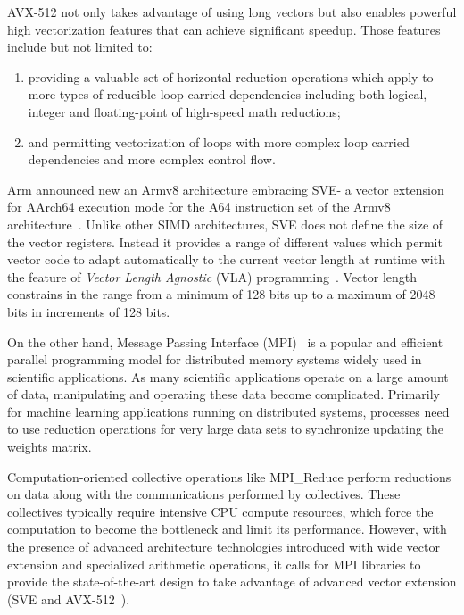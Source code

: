\documentclass[sigconf]{acmart}
\newcommand{\mpi}[0]{\textsc{MPI}\xspace}
\newcommand{\arm}[0]{Arm\xspace}
\newcommand{\sve}[0]{\textsc{SVE}\xspace}
\begin{document}
AVX-512 not only takes advantage of using long vectors but also enables powerful high
vectorization features that can achieve significant speedup. Those features
include but not limited to:
\begin{enumerate}
  \item providing a valuable set of horizontal reduction operations which apply to more
  types of reducible loop carried dependencies including both logical, integer
  and floating-point of high-speed math reductions;
  \item and permitting vectorization of loops with more complex loop carried dependencies and more complex control flow.
\end{enumerate}

\arm announced new an Armv8 architecture embracing \sve - a vector extension for AArch64
execution mode for the A64 instruction set of the
Armv8 architecture~\cite{arm-v8-ref, ARMv8-Architecture}.
Unlike other SIMD architectures, \sve does not define the size of
the vector registers. Instead it provides a range of different values which permit vector
code to adapt automatically to the current vector length at runtime with the
feature of \emph{Vector Length Agnostic} (VLA) programming~\cite{Advanced-SIMD,vla-stencil}.
Vector length constrains in the range from a minimum of 128 bits up to
a maximum of 2048 bits in increments of 128 bits.

On the other hand, Message Passing Interface (\mpi)~\cite{mpi-forum} is a popular and efficient parallel
programming model for distributed memory systems widely used in scientific applications.
As many scientific applications operate on a large amount of data, manipulating and operating these data become complicated.
%
Primarily for machine learning applications running on distributed systems,
processes need to use reduction operations for very large data sets to
synchronize updating the weights matrix.

Computation-oriented collective operations like MPI\_Reduce perform reductions on
data along with the communications performed by collectives.
These collectives typically require intensive CPU compute resources, which force
the computation to become the bottleneck and limit its performance.
However, with the presence of advanced architecture technologies introduced
with wide vector extension and specialized arithmetic operations, it calls for
MPI libraries to provide the state-of-the-art design to take advantage of advanced vector
extension (\sve and AVX-512~\cite{avx-info, Cebrian2019}).
\end{document}
